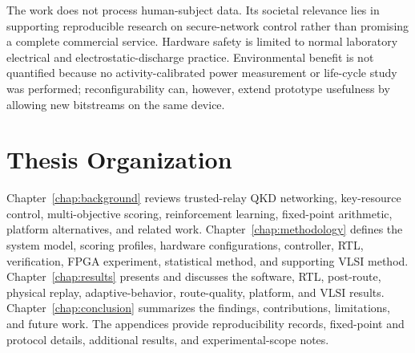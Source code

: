 The work does not process human-subject data. Its societal relevance lies in
supporting reproducible research on secure-network control rather than promising a
complete commercial service. Hardware safety is limited to normal laboratory
electrical and electrostatic-discharge practice. Environmental benefit is not
quantified because no activity-calibrated power measurement or life-cycle study was
performed; reconfigurability can, however, extend prototype usefulness by allowing
new bitstreams on the same device.

\section{Thesis Organization}

Chapter~\ref{chap:background} reviews trusted-relay QKD networking, key-resource
control, multi-objective scoring, reinforcement learning, fixed-point arithmetic,
platform alternatives, and related work. Chapter~\ref{chap:methodology} defines the
system model, scoring profiles, hardware configurations, controller, RTL,
verification, FPGA experiment, statistical method, and supporting VLSI method.
Chapter~\ref{chap:results} presents and discusses the software, RTL, post-route,
physical replay, adaptive-behavior, route-quality, platform, and VLSI results.
Chapter~\ref{chap:conclusion} summarizes the findings, contributions, limitations,
and future work. The appendices provide reproducibility records, fixed-point and
protocol details, additional results, and experimental-scope notes.

